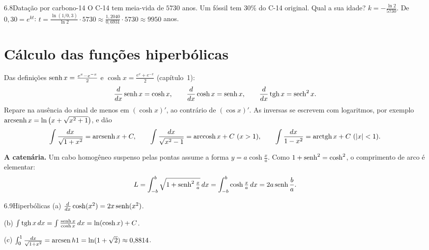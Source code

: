 \begin{exemplo}{6.8}{Datação por carbono-14}
O C-14 tem meia-vida de $5730$ anos. Um fóssil tem $30\%$ do C-14 original. Qual a sua idade?
\solucao
$k=-\frac{\ln2}{5730}$. De $0{,}30=e^{kt}$: $t=\frac{\ln(1/0{,}3)}{\ln2}\cdot5730
\approx\frac{1{,}2040}{0{,}6931}\cdot5730\approx9950$ anos.
\end{exemplo}

\section{Cálculo das funções hiperbólicas}

Das definições $\operatorname{senh} x=\frac{e^x-e^{-x}}2$ e $\cosh x=\frac{e^x+e^{-x}}2$ (capítulo~1):
\[
\frac{d}{dx}\operatorname{senh} x=\cosh x,\qquad \frac{d}{dx}\cosh x=\operatorname{senh} x,\qquad
\frac{d}{dx}\operatorname{tgh} x=\operatorname{sech}^2x .
\]
Repare na ausência do sinal de menos em $(\cosh x)'$, ao contrário de $(\cos x)'$. As inversas
se escrevem com logaritmos, por exemplo $\operatorname{arcsenh} x=\ln\big(x+\sqrt{x^2+1}\big)$, e dão
\[
\int\frac{dx}{\sqrt{1+x^2}}=\operatorname{arcsenh} x+C,\qquad
\int\frac{dx}{\sqrt{x^2-1}}=\operatorname{arccosh} x+C\ (x>1),\qquad
\int\frac{dx}{1-x^2}=\operatorname{arctgh} x+C\ (|x|<1).
\]

\textbf{A catenária.} Um cabo homogêneo suspenso pelas pontas assume a forma
$y=a\cosh\frac xa$. Como $1+\operatorname{senh}^2=\cosh^2$, o comprimento de arco é elementar:
\[
L=\int_{-b}^b\sqrt{1+\operatorname{senh}^2\tfrac xa}\,dx=\int_{-b}^b\cosh\tfrac xa\,dx=2a\operatorname{senh}\frac ba .
\]

\begin{exemplo}{6.9}{Hiperbólicas}
(a) $\frac{d}{dx}\cosh(x^2)=2x\operatorname{senh}(x^2)$.

(b) $\int\operatorname{tgh} x\,dx=\int\frac{\operatorname{senh} x}{\cosh x}\,dx=\ln(\cosh x)+C$.

(c) $\int_0^1\frac{dx}{\sqrt{1+x^2}}=\operatorname{arcsen} h1=\ln(1+\sqrt2)\approx0{,}8814$.
\end{exemplo}

